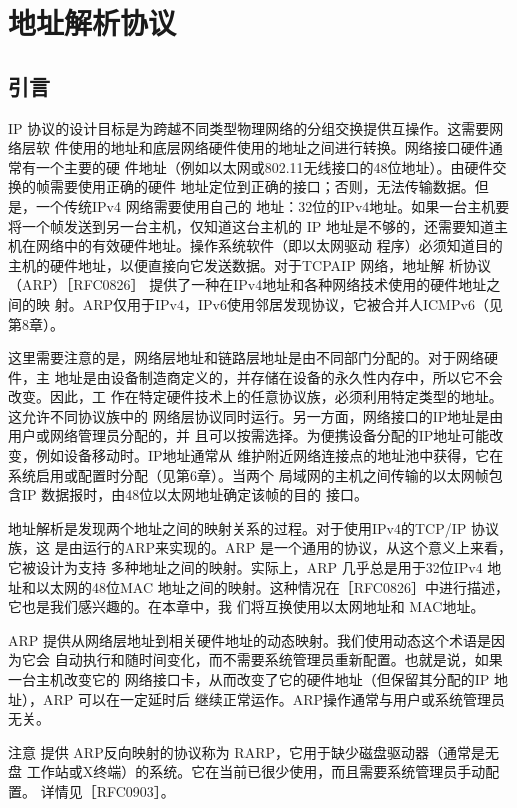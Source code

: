 \chapter{地址解析协议}

\section{引言}

IP 协议的设计目标是为跨越不同类型物理网络的分组交换提供互操作。这需要网络层软
件使用的地址和底层网络硬件使用的地址之间进行转换。网络接口硬件通常有一个主要的硬
件地址（例如以太网或802.11无线接口的48位地址）。由硬件交换的帧需要使用正确的硬件
地址定位到正确的接口；否则，无法传输数据。但是，一个传统IPv4 网络需要使用自己的
地址：32位的IPv4地址。如果一台主机要将一个帧发送到另一台主机，仅知道这台主机的
IP 地址是不够的，还需要知道主机在网络中的有效硬件地址。操作系统软件（即以太网驱动
程序）必须知道目的主机的硬件地址，以便直接向它发送数据。对于TCPAIP 网络，地址解
析协议（ARP）［RFC0826］ 提供了一种在IPv4地址和各种网络技术使用的硬件地址之间的映
射。ARP仅用于IPv4，IPv6使用邻居发现协议，它被合并人ICMPv6（见第8章）。

这里需要注意的是，网络层地址和链路层地址是由不同部门分配的。对于网络硬件，主
地址是由设备制造商定义的，并存储在设备的永久性内存中，所以它不会改变。因此，工
作在特定硬件技术上的任意协议族，必须利用特定类型的地址。这允许不同协议族中的
网络层协议同时运行。另一方面，网络接口的IP地址是由用户或网络管理员分配的，并
且可以按需选择。为便携设备分配的IP地址可能改变，例如设备移动时。IP地址通常从
维护附近网络连接点的地址池中获得，它在系统启用或配置时分配（见第6章）。当两个
局域网的主机之间传输的以太网帧包含IP 数据报时，由48位以太网地址确定该帧的目的
接口。

地址解析是发现两个地址之间的映射关系的过程。对于使用IPv4的TCP/IP 协议族，这
是由运行的ARP来实现的。ARP 是一个通用的协议，从这个意义上来看，它被设计为支持
多种地址之间的映射。实际上，ARP 几乎总是用于32位IPv4 地址和以太网的48位MAC
地址之间的映射。这种情况在［RFC0826］中进行描述，它也是我们感兴趣的。在本章中，我
们将互换使用以太网地址和 MAC地址。

ARP 提供从网络层地址到相关硬件地址的动态映射。我们使用动态这个术语是因为它会
自动执行和随时间变化，而不需要系统管理员重新配置。也就是说，如果一台主机改变它的
网络接口卡，从而改变了它的硬件地址（但保留其分配的IP 地址），ARP 可以在一定延时后
继续正常运作。ARP操作通常与用户或系统管理员无关。

注意 提供 ARP反向映射的协议称为 RARP，它用于缺少磁盘驱动器（通常是无盘
工作站或X终端）的系统。它在当前已很少使用，而且需要系统管理员手动配置。
详情见［RFC0903］。

